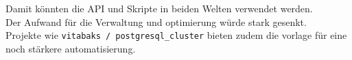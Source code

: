 \begin{flushleft}
    Damit könnten die API und Skripte in beiden Welten verwendet werden.\\
    Der Aufwand für die Verwaltung und optimierung würde stark gesenkt.\\
    Projekte wie \texttt{vitabaks / postgresql\_cluster}\cite{HIQVBEPF} bieten zudem die vorlage für eine noch stärkere automatisierung.
\end{flushleft}